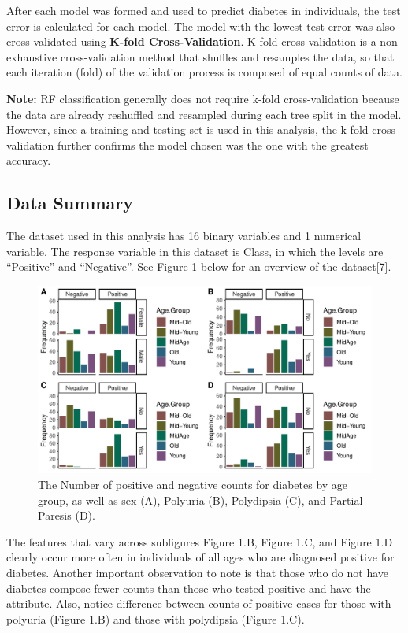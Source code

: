\documentclass[
]{article}
\begin{document}
After each model was formed and used to predict diabetes in individuals,
the test error is calculated for each model. The model with the lowest
test error was also cross-validated using \textbf{K-fold
Cross-Validation}. K-fold cross-validation is a non-exhaustive
cross-validation method that shuffles and resamples the data, so that
each iteration (fold) of the validation process is composed of equal
counts of data.

\textbf{Note:} RF classification generally does not require k-fold
cross-validation because the data are already reshuffled and resampled
during each tree split in the model. However, since a training and
testing set is used in this analysis, the k-fold cross-validation
further confirms the model chosen was the one with the greatest
accuracy.

\hypertarget{data-summary}{%
\subsection{Data Summary}\label{data-summary}}

The dataset used in this analysis has 16 binary variables and 1
numerical variable. The response variable in this dataset is Class, in
which the levels are ``Positive'' and ``Negative''. See Figure 1 below
for an overview of the dataset{[}7{]}.

\begin{figure}[h!]
\centering
\includegraphics{FinalArticle_files/figure-latex/unnamed-chunk-2-1.pdf}
\caption{The Number of positive and negative counts for diabetes by age
group, as well as sex (A), Polyuria (B), Polydipsia (C), and Partial
Paresis (D).}
\end{figure}

The features that vary across subfigures Figure 1.B, Figure 1.C, and
Figure 1.D clearly occur more often in individuals of all ages who are
diagnosed positive for diabetes. Another important observation to note
is that those who do not have diabetes compose fewer counts than those
who tested positive and have the attribute. Also, notice difference
between counts of positive cases for those with polyuria (Figure 1.B)
and those with polydipsia (Figure 1.C).
\end{document}
